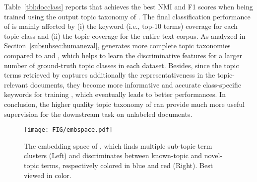 Table~\ref{tbl:docclass} reports that \weshclass achieves the best NMI and F1 scores when being trained using the output topic taxonomy of \proposed.
The final classification performance of \weshclass is mainly affected by (i) the keyword (i.e., top-10 terms) coverage for each topic class and (ii) the topic coverage for the entire text corpus.
As analyzed in Section~\ref{subsubsec:humaneval}, \proposed generates more complete topic taxonomies compared to \josh and \corel, which helps \weshclass to learn the discriminative features for a larger number of ground-truth topic classes in each dataset. 
Besides, since the topic terms retrieved by \proposed captures additionally the representativeness in the topic-relevant documents, they become more informative and accurate class-specific keywords for training \weshclass, which eventually leads to better performances.
In conclusion, the higher quality topic taxonomy of \proposed can provide much more useful supervision for the downstream task on unlabeled documents.





\begin{figure}[t]
    \centering
    \texttt{[image: FIG/embspace.pdf]}
    \caption{The embedding space of \proposed, which finds multiple sub-topic term clusters (Left) and discriminates between known-topic and novel-topic terms, respectively colored in blue and red (Right). Best viewed in color.}
    \label{fig:embspace}
\end{figure}

